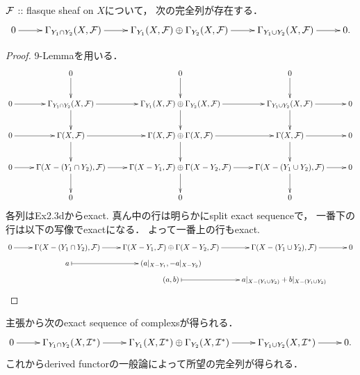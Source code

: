 \documentclass[a4paper]{jsarticle}
\begin{document}
    \begin{Claim}
        $\mathcal{F}$ :: flasque sheaf on $X$について，
        次の完全列が存在する．
        \[
        \xymatrix@R=10pt
        {
            0 \ar[r]&
                \Gamma_{Y_1 \cap Y_2}(X, \shF) \ar[r]&
                \Gamma_{Y_1}(X, \shF) \oplus \Gamma_{Y_2}(X, \shF) \ar[r]&
                \Gamma_{Y_1 \cup Y_2}(X, \shF) \ar[r]&
            0.
        }
        \]
    \end{Claim}
    \begin{proof}
        9-Lemmaを用いる．
        \[
        \xymatrix
        {
            {} & 0 \ar[d]& 0 \ar[d]& 0 \ar[d]& {} \\
            0 \ar[r]&
            \Gamma_{Y_1 \cap Y_2}(X, \shF) \ar[r]\ar[d]&
                \Gamma_{Y_1}(X, \shF) \oplus \Gamma_{Y_2}(X, \shF) \ar[r]\ar[d]&
                \Gamma_{Y_1 \cup Y_2}(X, \shF) \ar[r]\ar[d]&
            0 \\
            0 \ar[r]&
                \Gamma(X, \shF) \ar[r]\ar[d]&
                \Gamma(X, \shF) \oplus \Gamma(X, \shF) \ar[r]\ar[d]&
                \Gamma(X, \shF) \ar[r]\ar[d]&
            0 \\
            0 \ar[r]&
            \Gamma(X-(Y_1 \cap Y_2), \shF) \ar[r]\ar[d]&
                \Gamma(X-Y_1, \shF) \oplus \Gamma(X-Y_2, \shF) \ar[r]\ar[d]&
                \Gamma(X-(Y_1 \cup Y_2), \shF) \ar[r]\ar[d]&
            0 \\
            {} & 0 & 0 & 0 & {}
        }
        \]
        各列はEx2.3dからexact.
        真ん中の行は明らかにsplit exact sequenceで，
        一番下の行は以下の写像でexactになる．
        よって一番上の行もexact.
        \[
        \xymatrix@R=5pt
        {
            0 \ar[r]&
            \Gamma(X-(Y_1 \cap Y_2), \shF) \ar[r]&
                \Gamma(X-Y_1, \shF) \oplus \Gamma(X-Y_2, \shF) \ar[r]&
                \Gamma(X-(Y_1 \cup Y_2), \shF) \ar[r]&
            0 \\
            {} & a \ar@{|->}[r]& (a|_{X-Y_1},-a|_{X-Y_2})& {} & {} \\
            {} & {}& (a,b) \ar@{|->}[r]& a|_{X-(Y_1 \cup Y_2)}+b|_{X-(Y_1 \cup Y_2)} & {} \\
        }
        \]
    \end{proof}
    主張から次のexact sequence of complexsが得られる．
    \[
    \xymatrix@R=10pt
    {
        0 \ar[r] & 
        \Gamma_{Y_1 \cap Y_2}(X, \shI^*) \ar[r]&
            \Gamma_{Y_1}(X, \shI^*) \oplus \Gamma_{Y_2}(X, \shI^*) \ar[r]&
            \Gamma_{Y_1 \cup Y_2}(X, \shI^*) \ar[r]&
        0.
    }
    \]
    これからderived functorの一般論によって所望の完全列が得られる．
\end{document}
